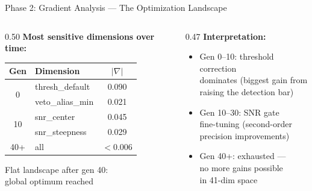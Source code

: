 \documentclass[aspectratio=169,12pt]{beamer}
\begin{document}
\begin{frame}{Phase 2: Gradient Analysis --- The Optimization Landscape}
  \begin{columns}[T]
    \begin{column}{0.50\textwidth}
      \textbf{Most sensitive dimensions over time:}

      \vspace{0.3em}
      {\small
      \begin{table}
        \begin{tabular}{@{}clc@{}}
          \toprule
          Gen & Dimension & $|\nabla|$ \\
          \midrule
          \multirow{2}{*}{0} & thresh\_default & 0.090 \\
          & veto\_alias\_min & 0.021 \\
          \midrule
          \multirow{2}{*}{10} & snr\_center & 0.045 \\
          & snr\_steepness & 0.029 \\
          \midrule
          40+ & all & $<$0.006 \\
          \bottomrule
        \end{tabular}
      \end{table}
      }

      \vspace{0.3em}
      Flat landscape after gen 40:\\
      \alert{global optimum reached}
    \end{column}
    \begin{column}{0.47\textwidth}
      \textbf{Interpretation:}
      \begin{itemize}
        \item Gen 0--10: threshold correction\\
              dominates (biggest gain from\\
              raising the detection bar)
        \item Gen 10--30: SNR gate\\
              fine-tuning (second-order\\
              precision improvements)
        \item Gen 40+: exhausted ---\\
              no more gains possible\\
              in 41-dim space
      \end{itemize}


\end{column}
\end{columns}
\end{frame}
\end{document}
